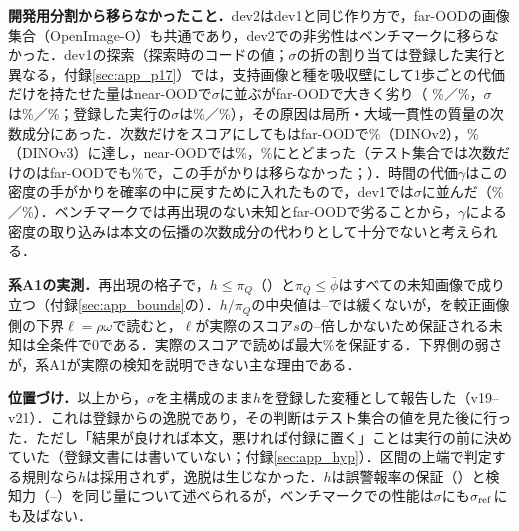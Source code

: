 \textbf{開発用分割から移らなかったこと．}dev2はdev1と同じ作り方で，far-OODの画像集合（OpenImage-O）も共通であり，dev2での非劣性はベンチマークに移らなかった．dev1の探索（探索時のコードの値；$\sigma$の折の割り当ては登録した実行と異なる，付録\ref{sec:app_p17}）では，支持画像と種を吸収壁にして1歩ごとの代価だけを持たせた量はnear-OODで$\sigma$に並ぶがfar-OODで大きく劣り（\FPR{} \NHsExplAbsOneNear\%／\NHsExplAbsOneFar\%，$\sigma$は\NHsExplSigNear\%／\NHsExplSigFar\%；登録した実行の$\sigma$は\NRFcDevOneNearPSixteen\%／\NRFcDevOneFarPSixteen\%），その原因は局所・大域一貫性の質量の次数成分にあった．次数だけをスコアにしても\AUC{}はfar-OODで\NHsExplDegAucFarVTwo\%（DINOv2），\NHsExplDegAucFarVThree\%（DINOv3）に達し，near-OODでは\NHsExplDegAucNearVTwo\%，\NHsExplDegAucNearVThree\%にとどまった（テスト集合では次数だけの\AUC{}はfar-OODでも\NRDecDegINFarAuroc\%で，この手がかりは移らなかった；）．時間の代価$\gamma$はこの密度の手がかりを確率の中に戻すために入れたもので，dev1では$\sigma$に並んだ（\NHsExplFinNear\%／\NHsExplFinFar\%）．ベンチマークでは再出現のない未知とfar-OODで劣ることから，$\gamma$による密度の取り込みは本文の伝播の次数成分の代わりとして十分でないと考えられる．

\textbf{系A1の実測．}再出現の格子で，$h\le\pi_Q$（\TEscape）と$\pi_Q\le\bar\phi$はすべての未知画像で成り立つ（付録\ref{sec:app_bounds}の）．$h/\pi_Q$の中央値は\NRBdHOneHOverPiMin--\NRBdHOneHOverPiMax{}で\TEscape{}は緩くないが，\CSep{}を較正画像側の下界$\ell=\rho\omega$で読むと，$\ell$が実際のスコア$s$の\NRBdHOneEllOverSMedMin--\NRBdHOneEllOverSMedMax{}倍しかないため保証される未知は全条件で0である．実際のスコアで読めば最大\NRBdHOneCertSMax\%を保証する．下界側の弱さが，系A1が実際の検知を説明できない主な理由である．

\textbf{位置づけ．}以上から，$\sigma$を主構成のまま$h$を登録した変種として報告した（v19--v21）．これは登録からの逸脱であり，その判断はテスト集合の値を見た後に行った．ただし「結果が良ければ本文，悪ければ付録に置く」ことは実行の前に決めていた（登録文書には書いていない；付録\ref{sec:app_hyp}）．区間の上端で判定する規則なら$h$は採用されず，逸脱は生じなかった．$h$は誤警報率の保証（\TValid）と検知力（\TEscape{}--\CSep）を同じ量について述べられるが，ベンチマークでの性能は$\sigma$にも$\sigma_{\mathrm{ref}}$にも及ばない．
